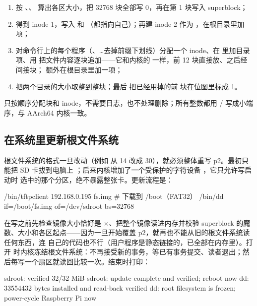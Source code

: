 \begin{enumerate}
  \item 按 、、 算出各区大小，把 32768 块全部写 0，再在第 1 块写入 superblock；
  \item {} 得到 inode 1，写入  和 （都指向自己）；再建 inode 2 作为 ，在根目录里加  项；
  \item 对命令行上的每个程序（、…去掉前缀下划线）分配一个 inode、在  里加目录项、用  把文件内容逐块追加——它和内核的  一样，前 12 块直接放、之后经间接块； 额外在根目录里加一项；
  \item 把两个目录的大小取整到整块；最后  把已经用掉的前  块在位图里标成 1。
\end{enumerate}

 只按顺序分配块和 inode，不需要日志，也不处理删除；所有整数都用 / 写成小端序，与 AArch64 内核一致。

\subsection{在系统里更新根文件系统}

根文件系统的格式一旦改动（例如  从 14 改成 30），就必须整体重写 p2。最初只能把 SD 卡拔到电脑上 ；后来内核增加了一个受保护的字符设备 ，它只允许写启动时  选中的那个分区，绝不暴露整张卡。更新流程是：

\begin{shcode}
/bin/tftpclient 192.168.0.195 fs.img          # 下载到 /boot（FAT32）
/bin/dd if=/boot/fs.img of=/dev/sdroot bs=32768
\end{shcode}

 在写之前先检查镜像大小恰好是 $\times$、把整个镜像读进内存并校验 superblock 的魔数、大小和各区起点——因为一旦开始覆盖 p2，就再也不能从旧的根文件系统读任何东西，连  自己的代码也不行（用户程序是静态链接的，已全部在内存里）。打开  时内核冻结根文件系统：不再接受新的事务，等已有事务提交、读者退出；然后每写一个扇区就读回比较一次。结束时打印：

\begin{txtcode}
sdroot: verified 32/32 MiB
sdroot: update complete and verified; reboot now
dd: 33554432 bytes installed and read-back verified
dd: root filesystem is frozen; power-cycle Raspberry Pi now
\end{txtcode}

